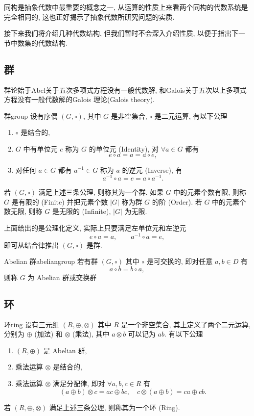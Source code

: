 \documentclass[cn,toc=twocol]{elegantbook}
\newcommand{\ITEMS}{\begin{enumerate}}
\newcommand{\ITEME}{\end{enumerate}}
\begin{document}
同构是抽象代数中最重要的概念之一, 从运算的性质上来看两个同构的代数系统是完全相同的, 这也正好揭示了抽象代数所研究问题的实质.
\bigskip

接下来我们将介绍几种代数结构, 但我们暂时不会深入介绍性质, 以便于指出下一节中数集的代数结构.

\subsection{群}

群论始于Abel关于五次多项式方程没有一般代数解, 和Galois关于五次以上多项式方程没有一般代数解的Galois 理论(Galois theory).

\begin{axiom}{群}{group}
	设有序偶 $(G,\circ)$, 其中 $G$ 是非空集合, $\circ$ 是二元运算, 有以下公理
	\ITEMS
		\item[{\boldmath $G_1$}] $\circ$ 是结合的,
		\item[{\boldmath $G_2$}] $G$ 中有单位元 $e$ 称为 $G$ 的单位元 (Identity), 对 $\forall a \in G$ 都有
		\[
			e \circ a = a = a \circ e,
		\]
		\item[{\boldmath $G_3$}]  对任何 $a \in G$ 都有 $a^{-1} \in G$ 称为 $a$ 的逆元 (Inverse), 有
		\[
			a^{-1} \circ a = e = a \circ a^{-1}.
		\] 
	\ITEME 
	若 $(G,\circ)$ 满足上述三条公理, 则称其为一个群. 如果 $G$ 中的元素个数有限, 则称 $G$ 是有限的 (Finite) 并把元素个数 $\lvert G \rvert$ 称为群 $G$ 的阶 (Order). 若 $G$ 中的元素个数无限, 则称 $G$ 是无限的 (Infinite), $\lvert G \rvert$ 为无限.
\end{axiom}

\begin{remark}
	上面给出的是公理化定义, 实际上只要满足左单位元和左逆元
	\[
		e \circ a = a,\qquad a^{-1} \circ a = e,
	\]
	即可从结合律推出 $(G,\circ)$ 是群.
\end{remark}

\begin{definition}{Abelian 群}{abeliangroup}
	若有群 $(G,\circ)$ 其中 $\circ$ 是可交换的, 即对任意 $a,b \in D$ 有
	\[
		a \circ b = b \circ a,
	\]
	则称 $G$ 为 Abelian 群或交换群
\end{definition}

\subsection{环}

\begin{axiom}{环}{ring}
	设有三元组 $(R,\oplus,\otimes)$ 其中 $R$ 是一个非空集合, 其上定义了两个二元运算, 分别为 $\oplus$ (加法) 和 $\otimes$ (乘法), 其中 $a \otimes b$ 可以记为 $ab$. 有以下公理
	\ITEMS
		\item[{\boldmath $R_1$}] $(R,\oplus)$ 是 Abelian 群,
		\item[{\boldmath $R_2$}] 乘法运算 $\otimes$ 是结合的,
		\item[{\boldmath $R_3$}] 乘法运算 $\otimes$ 满足分配律, 即对 $\forall a,b,c \in R$ 有
		\[
			(a \oplus b) \otimes c = ac \oplus bc, \quad c \otimes(a\oplus b) = ca \oplus cb.
		\]
	\ITEME
	若 $(R,\oplus,\otimes)$ 满足上述三条公理, 则称其为一个环 (Ring). 
\end{axiom}
\end{document}
